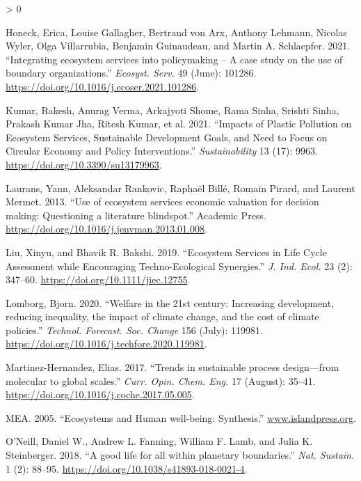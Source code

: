 \documentclass[
  14pt,
]{extarticle}
\newlength{\cslhangindent}
\newenvironment{CSLReferences}[2] %
 {%
  \setlength{\parindent}{0pt}
  \ifodd #1 \everypar{\setlength{\hangindent}{\cslhangindent}}\ignorespaces\fi
  \ifnum #2 > 0
  \setlength{\parskip}{#2\baselineskip}
  \fi
 }%
 {}
\begin{document}
\begin{CSLReferences}{1}{0}
\leavevmode\hypertarget{ref-Honeck2021}{}%
Honeck, Erica, Louise Gallagher, Bertrand von Arx, Anthony Lehmann, Nicolas Wyler, Olga Villarrubia, Benjamin Guinaudeau, and Martin A. Schlaepfer. 2021. {``{Integrating ecosystem services into policymaking -- A case study on the use of boundary organizations}.''} \emph{Ecosyst. Serv.} 49 (June): 101286. \url{https://doi.org/10.1016/j.ecoser.2021.101286}.

\leavevmode\hypertarget{ref-Kumar2021}{}%
Kumar, Rakesh, Anurag Verma, Arkajyoti Shome, Rama Sinha, Srishti Sinha, Prakash Kumar Jha, Ritesh Kumar, et al. 2021. {``{Impacts of Plastic Pollution on Ecosystem Services, Sustainable Development Goals, and Need to Focus on Circular Economy and Policy Interventions}.''} \emph{Sustainability} 13 (17): 9963. \url{https://doi.org/10.3390/su13179963}.

\leavevmode\hypertarget{ref-Laurans2013}{}%
Laurans, Yann, Aleksandar Rankovic, Raphaël Billé, Romain Pirard, and Laurent Mermet. 2013. {``{Use of ecosystem services economic valuation for decision making: Questioning a literature blindspot}.''} Academic Press. \url{https://doi.org/10.1016/j.jenvman.2013.01.008}.

\leavevmode\hypertarget{ref-Liu2019g}{}%
Liu, Xinyu, and Bhavik R. Bakshi. 2019. {``{Ecosystem Services in Life Cycle Assessment while Encouraging Techno-Ecological Synergies}.''} \emph{J. Ind. Ecol.} 23 (2): 347--60. \url{https://doi.org/10.1111/jiec.12755}.

\leavevmode\hypertarget{ref-Lomborg2020}{}%
Lomborg, Bjorn. 2020. {``{Welfare in the 21st century: Increasing development, reducing inequality, the impact of climate change, and the cost of climate policies}.''} \emph{Technol. Forecast. Soc. Change} 156 (July): 119981. \url{https://doi.org/10.1016/j.techfore.2020.119981}.

\leavevmode\hypertarget{ref-Martinez-Hernandez2017}{}%
Martinez-Hernandez, Elias. 2017. {``{Trends in sustainable process design---from molecular to global scales}.''} \emph{Curr. Opin. Chem. Eng.} 17 (August): 35--41. \url{https://doi.org/10.1016/j.coche.2017.05.005}.

\leavevmode\hypertarget{ref-MEA2005}{}%
MEA. 2005. {``{Ecosystems and Human well-being: Synthesis}.''} \href{https://www.islandpress.org}{www.islandpress.org}.

\leavevmode\hypertarget{ref-ONeill2018}{}%
O'Neill, Daniel W., Andrew L. Fanning, William F. Lamb, and Julia K. Steinberger. 2018. {``{A good life for all within planetary boundaries}.''} \emph{Nat. Sustain.} 1 (2): 88--95. \url{https://doi.org/10.1038/s41893-018-0021-4}.


\end{CSLReferences}
\end{document}
